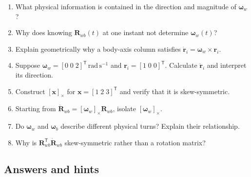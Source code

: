 \documentclass[
  australian,
  12pt,
  letterpaper,
  DIV=11,
  numbers=noendperiod,
  twoside]{scrreprt}
\providecommand{\tightlist}{%
  \setlength{\itemsep}{0pt}\setlength{\parskip}{0pt}}
\begin{document}

\begin{enumerate}
\def\labelenumi{\arabic{enumi}.}
\tightlist
\item
  What physical information is contained in the direction and magnitude
  of \(\boldsymbol\omega_w\)?
\item
  Why does knowing \(\mathbf R_{wb}(t)\) at one instant not determine
  \(\boldsymbol\omega_w(t)\)?
\item
  Explain geometrically why a body-axis column satisfies
  \(\dot{\mathbf r}_i=\boldsymbol\omega_w\times\mathbf r_i\).
\item
  Suppose
  \(\boldsymbol\omega_w=[0\;0\;2]^\mathsf T\,\mathrm{rad\,s^{-1}}\) and
  \(\mathbf r_i=[1\;0\;0]^\mathsf T\). Calculate \(\dot{\mathbf r}_i\)
  and interpret its direction.
\item
  Construct \([\mathbf x]_\times\) for \(\mathbf x=[1\;2\;3]^\mathsf T\)
  and verify that it is skew-symmetric.
\item
  Starting from
  \(\dot{\mathbf R}_{wb}=[\boldsymbol\omega_w]_\times\mathbf R_{wb}\),
  isolate \([\boldsymbol\omega_w]_\times\).
\item
  Do \(\boldsymbol\omega_w\) and \(\boldsymbol\omega_b\) describe
  different physical turns? Explain their relationship.
\item
  Why is \(\mathbf R_{wb}^\mathsf T\dot{\mathbf R}_{wb}\) skew-symmetric
  rather than a rotation matrix?
\end{enumerate}

\subsection*{Answers and hints}\label{answers-and-hints-18}
\end{document}
